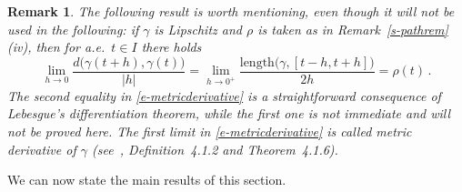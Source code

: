 \documentclass[11pt,reqno,a4paper,final]{amsart}
\numberwithin{equation}{section}
\theoremstyle{mytheorem}
\newtheorem{proposition}[subsection]{Proposition}
\theoremstyle{myremark}
\newtheorem{remark}[subsection]{Remark}
\theoremstyle{myparagraph}
\newtheorem{parag}[subsection]{}
\newcommand{\footnoteb}[1]{\footnote{~#1}}
\newenvironment{itemizeb}
{\begin{itemize}\itemsep=2pt\leftskip -5 pt}
{\end{itemize}}
\newcommand{\Len}{\mathrm{length}}
\newcommand{\Lip}{\mathrm{Lip}}
\begin{document}
\begin{remark}
\label{s-pathrem2}
The following result is worth mentioning,
even though it will not be used in the following:
if $\gamma$ is Lipschitz and $\rho$
is taken as in Remark~\ref{s-pathrem}(iv), then
for a.e.~$t\in I$ there holds
%
\begin{equation}
\label{e-metricderivative}
\lim_{h\to 0} \frac{d\big( \gamma(t+h),\gamma(t) \big)}{|h|}
=\lim_{h\to 0^+} \frac{\Len\big(\gamma,[t-h,t+h] \big)}{2h}
=\rho(t)
\, .
\end{equation}
%
The second equality in \eqref{e-metricderivative}
is a straightforward consequence of Lebesgue's differentiation theorem, 
while the first one is not immediate and will not be proved here.
The first limit in \eqref{e-metricderivative}
is called \emph{metric derivative} of $\gamma$ 
(see~\cite{AT}, Definition~4.1.2 and Theorem~4.1.6). 
\end{remark}


%
%
%
%
%
%


We can now state the main results of this section.
\end{document}
